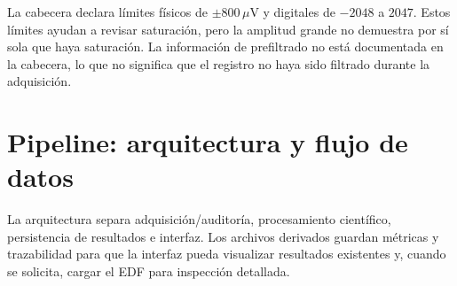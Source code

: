 \documentclass[11pt,a4paper]{article}
\begin{document}
La cabecera declara límites físicos de $\pm800\,\mu$V y digitales de $-2048$ a $2047$. Estos límites ayudan a revisar saturación, pero la amplitud grande no demuestra por sí sola que haya saturación. La información de prefiltrado no está documentada en la cabecera, lo que no significa que el registro no haya sido filtrado durante la adquisición.

\section{Pipeline: arquitectura y flujo de datos}
La arquitectura separa adquisición/auditoría, procesamiento científico, persistencia de resultados e interfaz. Los archivos derivados guardan métricas y trazabilidad para que la interfaz pueda visualizar resultados existentes y, cuando se solicita, cargar el EDF para inspección detallada.
\end{document}
